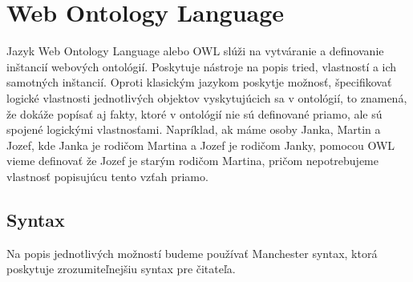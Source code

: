 \documentclass[12pt, a4paper, oneside]{book}
\begin{document}
\section{Web Ontology Language}
Jazyk Web Ontology Language alebo OWL slúži na vytváranie a definovanie inštancií webových ontológií. Poskytuje nástroje na popis tried, vlastností a ich samotných inštancií. Oproti klasickým jazykom poskytje možnosť, špecifikovať logické vlastnosti jednotlivých objektov vyskytujúcich sa v ontológií, to znamená, že dokáže popísať aj fakty, ktoré v ontológií nie sú definované priamo, ale sú spojené logickými vlastnosťami. Napríklad, ak máme osoby Janka, Martin a Jozef, kde Janka je rodičom Martina a Jozef je rodičom Janky, pomocou OWL vieme definovať že Jozef je starým rodičom Martina, pričom nepotrebujeme vlastnosť popisujúcu tento vzťah priamo.













\subsection{Syntax}
Na popis jednotlivých možností budeme používať Manchester syntax, ktorá poskytuje zrozumiteľnejšiu syntax pre čitateľa.
\end{document}
